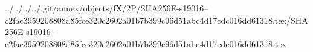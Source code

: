 ../../../../.git/annex/objects/fX/2P/SHA256E-s19016--c2fac3959208808d85fce320c2602a01b7b399c96d51abc4d17cdc016dd61318.tex/SHA256E-s19016--c2fac3959208808d85fce320c2602a01b7b399c96d51abc4d17cdc016dd61318.tex